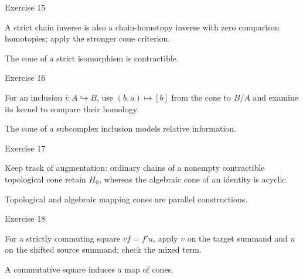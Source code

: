 \begin{exercise}\label{exr:viii24-15}
Exercise 15
\end{exercise}
\begin{hint}
A strict chain inverse is also a chain-homotopy inverse with zero comparison homotopies; apply the stronger cone criterion.
\end{hint}
\begin{solution}
The cone of a strict isomorphism is contractible.
\end{solution}

\begin{exercise}\label{exr:viii24-16}
Exercise 16
\end{exercise}
\begin{hint}
For an inclusion \(i:A\hookrightarrow B\), use \((b,a)\mapsto[b]\) from the cone to \(B/A\) and examine its kernel to compare their homology.
\end{hint}
\begin{solution}
The cone of a subcomplex inclusion models relative information.
\end{solution}

\begin{exercise}\label{exr:viii24-17}
Exercise 17
\end{exercise}
\begin{hint}
Keep track of augmentation: ordinary chains of a nonempty contractible topological cone retain \(H_0\), whereas the algebraic cone of an identity is acyclic.
\end{hint}
\begin{solution}
Topological and algebraic mapping cones are parallel constructions.
\end{solution}

\begin{exercise}\label{exr:viii24-18}
Exercise 18
\end{exercise}
\begin{hint}
For a strictly commuting square \(vf=f'u\), apply \(v\) on the target summand and \(u\) on the shifted source summand; check the mixed term.
\end{hint}
\begin{solution}
A commutative square induces a map of cones.
\end{solution}

